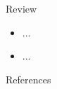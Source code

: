 \documentclass{beamer}
\begin{document}

\begin{frame}{Review}

\begin{itemize}
  \itemsep12pt
  \item ...
  \item ...
\end{itemize}

\end{frame}


\setbeamercovered{}
\beamerdefaultoverlayspecification{}

\begin{frame}[c,allowframebreaks]{References}

\small

\nocite{*}

\itemize

\end{frame}

\end{document}
